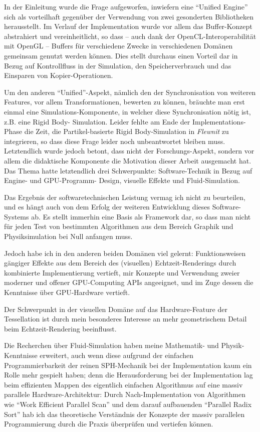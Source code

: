 
\label{sec:Fazit}

In der Einleitung wurde die Frage aufgeworfen, inwiefern eine "`Unified Engine"' sich als vorteilhaft
gegenüber der Verwendung von zwei gesonderten Bibliotheken herausstellt.
Im Verlauf der Implementation wurde vor allem das Buffer-Konzept abstrahiert und vereinheitlicht,
so dass -- auch dank der OpenCL-Interoperabilität mit OpenGL -- Buffers für verschiedene Zwecke
in verschiedenen Domänen gemeinsam genutzt werden können. Dies stellt durchaus einen Vorteil dar
in Bezug auf Kontrollfluss in der Simulation, den Speicherverbrauch und das Einsparen von Kopier-Operationen.

Um den anderen "`Unified"'-Aspekt, nämlich den der Synchronisation von weiteren Features, vor allem
Transformationen, bewerten zu können, bräuchte man erst einmal eine Simulations-Komponente, 
in welcher diese Synchronisation nötig ist, z.B. eine Rigid Body- Simulation.
Leider fehlte am Ende der Implementations-Phase die Zeit, die Partikel-basierte Rigid Body-Simulation 
in \emph{Flewnit} zu integrieren, so dass diese Frage leider noch unbeantwortet bleiben muss.\\

Letztendlich wurde jedoch betont, dass nicht der Forschungs-Aspekt, sondern vor allem die didaktische Komponente
die Motivation dieser Arbeit ausgemacht hat. Das Thema hatte letztendlich drei Schwerpunkte: 
Software-Technik in Bezug auf Engine- und GPU-Programm- Design, visuelle Effekte und Fluid-Simulation.

Das Ergebnis der softwaretechnischen Leistung vermag ich nicht zu beurteilen, und es hängt auch von dem
Erfolg der weiteren Entwicklung dieses Software-Systems ab. Es stellt immerhin eine Basis als Framework dar, 
so dass man nicht für jeden Test von bestimmten Algorithmen aus dem Bereich Graphik und Physiksimulation 
bei Null anfangen muss.

Jedoch habe ich in den anderen beiden Domänen viel gelernt:
Funktionsweisen gängiger Effekte aus dem Bereich des (visuellen) Echtzeit-Renderings durch kombinierte Implementierung vertieft, mir Konzepte und Verwendung zweier moderner und offener GPU-Computing APIs angeeignet, und im
Zuge dessen die Kenntnisse über GPU-Hardware vertieft.

Der Schwerpunkt in der visuellen Domäne auf das Hardware-Feature der Tessellation ist durch mein besonderes
Interesse an mehr geometrischem Detail beim Echtzeit-Rendering beeinflusst.

Die Recherchen über Fluid-Simulation haben meine Mathematik- und Physik-Kenntnisse erweitert, auch wenn diese
aufgrund der einfachen Programmierbarkeit der reinen SPH-Mechanik bei der Implementation kaum ein Rolle mehr gespielt haben; denn die Herausforderung bei der Implementation lag beim effizienten Mappen des eigentlich einfachen 
Algorithmus auf eine massiv parallele Hardware-Architektur: Durch Nach-Implementation von Algorithmen wie "`Work Efficient Parallel Scan"' und dem darauf aufbauenden "`Parallel Radix Sort"' hab ich das theoretische Verständnis 
der Konzepte der massiv parallelen Programmierung durch die Praxis überprüfen und vertiefen können.\\

